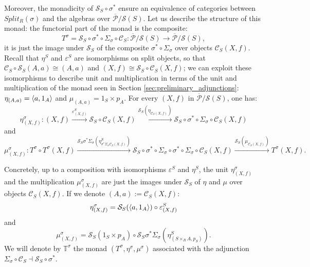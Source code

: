 Moreover, the monadicity of $\mathcal{S}_S\circ\sigma^*$ ensure an equivalence of categories between $Split_R(\sigma)$ and the algebras over $\overline{\mathcal{P}}/\mathcal{S}(S)$. Let us describe the structure of this monad: the functorial part of the monad is the composite:
\[ T^\sigma = \mathcal{S}_S\circ\sigma^*\circ\Sigma_\sigma\circ\mathcal{C}_S: \overline{\mathcal{P}}/\mathcal{S}(S)\longrightarrow\overline{\mathcal{P}}/\mathcal{S}(S), \]
it is just the image under $\mathcal{S}_S$ of the composite $\sigma^*\circ\Sigma_\sigma$ over objects $\mathcal{C}_S(X,f)$. Recall that $\eta^S$ and $\varepsilon^S$ are isomorphisms on split objects, so that $\mathcal{C}_S\circ\mathcal{S}_S(A,a)\cong(A,a)$ and $(X,f)\cong\mathcal{S}_S\circ\mathcal{C}_S(X,f)$; we can exploit these isomorphisms to describe unit and multiplication in terms of the unit and multiplication of the monad seen in Section \ref{sec:preliminary_adjunctions}: $\eta_{(A,a)}=\langle{a},{1_A}\rangle$ and $\mu_{(A,a)}=1_S\times p_A$. For every $(X,f)$ in $\overline{\mathcal{P}}/\mathcal{S}(S)$, one has:
\[ \eta^\sigma_{(X,f)}:(X,f)\xrightarrow{\varepsilon^S_{(X,f)}}\mathcal{S}_S\circ\mathcal{C}_S(X,f)\xrightarrow{\mathcal{S}_S(\eta_{\mathcal{C}_S(X,f)})}\mathcal{S}_S\circ\sigma^*\circ\Sigma_\sigma\circ\mathcal{C}_S(X,f) \]
and
\[ \mu^\sigma_{(X,f)}:T^\sigma\circ T^\sigma(X,f)\xrightarrow{\mathcal{S}_S\sigma^*\Sigma_\sigma(\eta^S_{\sigma^*\Sigma_\sigma\mathcal{C}_S(X,f)})}\mathcal{S}_S\circ\sigma^*\circ\Sigma_\sigma\circ\sigma^*\circ\Sigma_\sigma\circ\mathcal{C}_S(X,f)\xrightarrow{\mathcal{S}_S(\mu_{\mathcal{C}_S(X,f)})}T^\sigma(X,f). \]

Concretely, up to a composition with isomorphisms $\varepsilon^S$ and $\eta^S$, the unit $\eta^\sigma_{(X,f)}$ and the multiplication $\mu^\sigma_{(X,f)}$ are just the images under $\mathcal{S}_S$ of $\eta$ and $\mu$ over objects $\mathcal{C}_S(X,f)$. If we denote $(A,a):=\mathcal{C}_S(X,f)$:
\[ \eta^\sigma_{(X,f)} = \mathcal{S}_S(\langle{a},{1_A}\rangle)\circ\varepsilon^S_{(X,f)} \]
and
\[ \mu^\sigma_{(X,f)} = \mathcal{S}_S(1_S\times p_A)\circ\mathcal{S}_S\sigma^*\Sigma_\sigma(\eta^S_{(S\times_RA,p_S)}). \]
We will denote by $\mathbb{T}^\sigma$ the monad $(T^\sigma, \eta^\sigma, \mu^\sigma)$ associated with the adjunction $\Sigma_\sigma\circ\mathcal{C}_S\dashv\mathcal{S}_S\circ\sigma^*$.


